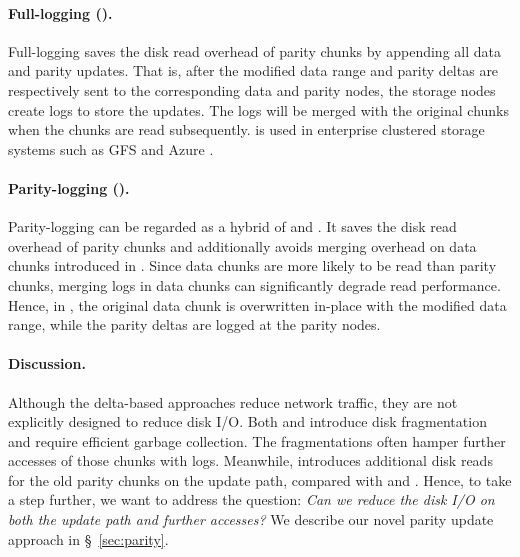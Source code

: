 \paragraph{Full-logging (\FL).} Full-logging saves the disk read overhead of
parity chunks by appending all data and parity updates. 
That is, after the modified data
range and parity deltas are respectively sent to the corresponding data and
parity nodes, the storage nodes create logs to store the updates.  The logs
will be merged with the original chunks when the chunks are read subsequently.
\FL is used in enterprise clustered storage systems such as 
GFS \cite{ghemawat03} and Azure \cite{calder11}. 

\paragraph{Parity-logging (\PL).} Parity-logging \cite{stodolsky93,jin11}
can be regarded as a hybrid of \FO and \FL.  It saves the disk read overhead of
parity chunks and additionally avoids merging overhead on data chunks introduced in \FL.
Since data chunks are more likely to be read than parity chunks,
merging logs in data chunks can significantly degrade read 
performance. Hence, in \PL, the original data chunk is overwritten in-place with the
modified data range, while the parity deltas are logged at the parity nodes.

\paragraph{Discussion.} 
Although the delta-based approaches reduce network traffic,
they are not explicitly designed to reduce disk I/O. Both \FL
and \PL introduce disk fragmentation and require efficient garbage
collection. The fragmentations often hamper further 
accesses of those chunks with logs. Meanwhile, \FO introduces additional disk reads
for the old parity chunks on the update path, compared with \FL and \PL.
Hence, to take a step further, we want to address the question: 
\textit{Can we reduce the disk I/O on both the update path and further
accesses?} We describe our novel parity update approach in \S~\ref{sec:parity}.

